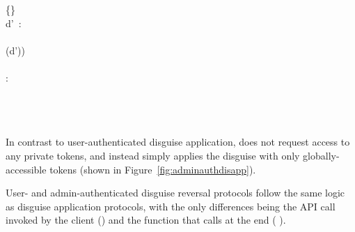 \begin{figure*}[t!]
{\<\<  \gets \{\}\\
\<\< \pcforeach d'~: \\
    \<\< \quad{}\\
    \<\<\quad\quad{}(d'))\\ 
\<\< \pcendforeach\\
\<\< \pcforeach {} \in {}: \\
\<\< \quad{}\\
\<\< \quad \quad {}\\ 
\<\< \pcendforeach\\
\<\< 
}
    \caption{\textbf{User-Authenticated disguise application.}}
    \label{fig:userauthdisapp}
\end{figure*}

In contrast to user-authenticated disguise application, \sys does not request access to any private
tokens, and instead simply applies the disguise with only globally-accessible tokens (shown in Figure~\ref{fig:adminauthdisapp}).

\begin{figure*}[t!]
    \caption{\textbf{Admin-authenticated disguise application}. }
    \label{fig:adminauthdisapp}
\end{figure*}

User- and admin-authenticated disguise
reversal protocols follow the same logic as disguise application protocols, with the only
differences being the API call invoked by the client 
() and the
function that \sys calls at the end ( ).


